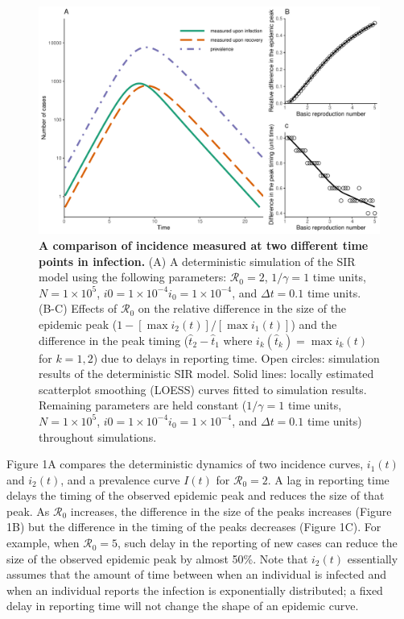 \documentclass[12pt]{article}\usepackage[]{graphicx}\usepackage[]{color}
\providecommand{\DIFaddtex}[1]{{\protect\color{blue}\textbf{#1}}} %
\providecommand{\DIFdeltex}[1]{{\protect\color{red}\sout{#1}}}                      %
\providecommand{\DIFaddFL}[1]{\DIFadd{#1}} %
\providecommand{\DIFdelFL}[1]{\DIFdel{#1}} %
\providecommand{\DIFaddbeginFL}{} %
\providecommand{\DIFaddendFL}{} %
\providecommand{\DIFdelbeginFL}{} %
\providecommand{\DIFdelendFL}{} %
\providecommand{\DIFadd}[1]{\texorpdfstring{\DIFaddtex{#1}}{#1}} %
\providecommand{\DIFdel}[1]{\texorpdfstring{\DIFdeltex{#1}}{}} %
\newcommand{\DIFscaledelfig}{0.5}
\newlength{\DIFdelgraphicswidth} %
\newlength{\DIFdelgraphicsheight} %
\newcommand{\DIFaddincludegraphics}[2][]{{\color{blue}\fbox{\DIFOincludegraphics[#1]{#2}}}} %
\newcommand{\DIFdelincludegraphics}[2][]{%
\sbox{\DIFdelgraphicsbox}{\DIFOincludegraphics[#1]{#2}}%
\settoboxwidth{\DIFdelgraphicswidth}{\DIFdelgraphicsbox} %
\settoboxtotalheight{\DIFdelgraphicsheight}{\DIFdelgraphicsbox} %
\scalebox{\DIFscaledelfig}{%
\parbox[b]{\DIFdelgraphicswidth}{\usebox{\DIFdelgraphicsbox}\\[-\baselineskip] \rule{\DIFdelgraphicswidth}{0em}}\llap{\resizebox{\DIFdelgraphicswidth}{\DIFdelgraphicsheight}{%
\setlength{\unitlength}{\DIFdelgraphicswidth}%
\begin{picture}(1,1)%
\thicklines\linethickness{2pt} %
{\color[rgb]{1,0,0}\put(0,0){\framebox(1,1){}}}%
{\color[rgb]{1,0,0}\put(0,0){\line( 1,1){1}}}%
{\color[rgb]{1,0,0}\put(0,1){\line(1,-1){1}}}%
\end{picture}%
}\hspace*{3pt}}} %
} %
\DeclareRobustCommand{\DIFaddbeginFL}{\DIFOaddbeginFL \let\includegraphics\DIFaddincludegraphics} %
\DeclareRobustCommand{\DIFaddendFL}{\DIFOaddendFL \let\includegraphics\DIFOincludegraphics} %
\DeclareRobustCommand{\DIFdelbeginFL}{\DIFOdelbeginFL \let\includegraphics\DIFdelincludegraphics} %
\DeclareRobustCommand{\DIFdelendFL}{\DIFOaddendFL \let\includegraphics\DIFOincludegraphics} %
\begin{document}
\begin{figure}[!t]
\DIFdelbeginFL %
\DIFdelendFL \DIFaddbeginFL \includegraphics[width=\textwidth]{example.pdf}
\DIFaddendFL \caption{
\textbf{A comparison of incidence measured at two different time points in infection.}
(A) 
A deterministic simulation of the SIR model using the following parameters: 
$\mathcal R_0 = 2$, $1/\gamma = 1$ time units, $N = 1 \times 10^5$, \DIFdelbeginFL \DIFdelFL{$i0 = 1 \times 10^{-4}$}\DIFdelendFL \DIFaddbeginFL \DIFaddFL{$i_0 = 1 \times 10^{-4}$}\DIFaddendFL ,
and $\Delta t = 0.1$ time units.
(B-C) Effects of $\mathcal R_0$ on the relative difference in the size of the epidemic peak ($1 - [\max i_2(t)]/[\max i_1(t)]$) and the difference in the peak timing ($\hat{t}_2 - \hat{t}_1$ where $i_k(\hat{t}_k) = \max i_k(t)$ for $k = 1, 2$) due to delays in reporting time.
Open circles: simulation results of the deterministic SIR model.
Solid lines: locally estimated scatterplot smoothing (LOESS) curves fitted to simulation results.
Remaining parameters are held constant ($1/\gamma = 1$ time units, $N = 1 \times 10^5$, \DIFdelbeginFL \DIFdelFL{$i0 = 1 \times 10^{-4}$}\DIFdelendFL \DIFaddbeginFL \DIFaddFL{$i_0 = 1 \times 10^{-4}$}\DIFaddendFL , and $\Delta t = 0.1$ time units) throughout simulations.
}
\end{figure}

Figure 1A compares the deterministic dynamics of two incidence curves,
$i_1(t)$ and $i_2(t)$, and a prevalence curve $I(t)$ for $\mathcal R_0 = 2$. 
A lag in reporting time delays
the timing of the observed epidemic peak and reduces the size of that peak.
As $\mathcal R_0$ increases, the difference in the size of the peaks increases (Figure 1B)
but the difference in the timing of the peaks decreases (Figure 1C).
For example, when $\mathcal R_0 = 5$, such delay in the reporting of new cases can reduce the size of the observed epidemic peak by almost 50\%.
Note that $i_2(t)$ essentially assumes that the amount of time between when an individual is infected and when an individual reports the infection is exponentially distributed; a fixed delay in reporting time will not change the shape of an epidemic curve.
\end{document}
